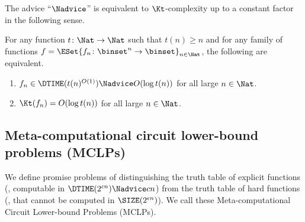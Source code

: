 \documentclass{toc}
\begin{document}
The advice ``$\Nadvice$'' is equivalent to $\Kt$-complexity
up to a constant factor
in the following sense.
\begin{fact}
  \label{fact_KtandAdvice}
  For any function $t \colon \Nat \to \Nat$
  such that $t(n) \ge n$
  and for any family of functions $f = \ESet{ f_n \colon \binset^n \to \binset }_{n \in \Nat}$,
  the following are equivalent.
  \begin{enumerate}
    \item
          $f_n \in \DTIME(t(n)^{O(1)}) \Nadvice O(\log t(n))$ for all large $n \in \Nat$.
    \item
          $\Kt(f_n) = O(\log t(n))$ for all large $n \in \Nat$.
  \end{enumerate}
\end{fact}

\subsection{Meta-computational circuit lower-bound problems (MCLPs)}
\label{subsection_DefiningMCLPs}
We define promise problems of
distinguishing
the truth table of explicit functions (\eg, computable in $\DTIME(2^{c n}) \Nadvice c n$)
from
the truth table of hard functions (\eg, that cannot be computed in $\SIZE(2^{\epsilon n})$).
We call these
Meta-computational Circuit Lower-bound Problems (MCLPs).
\end{document}

